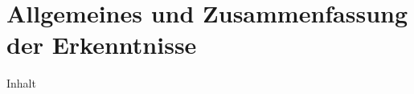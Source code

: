 \section{Allgemeines und Zusammenfassung der Erkenntnisse}
\label{sec:04-03_general-aspects-and-summery-of-findings}

Inhalt
